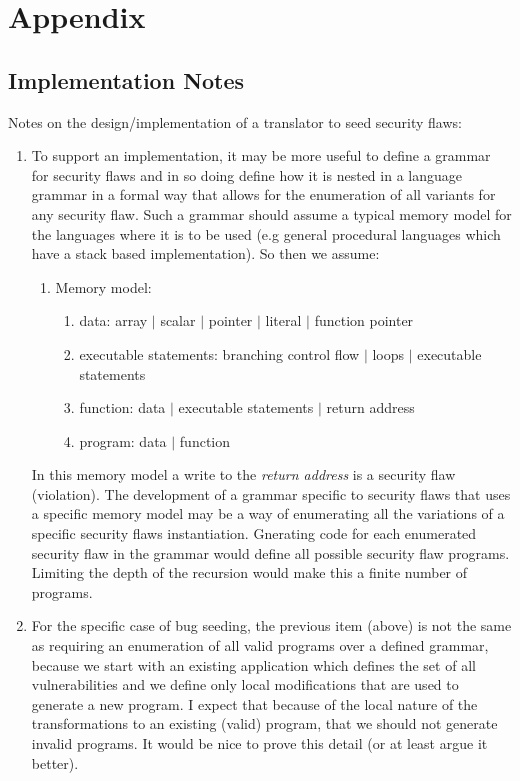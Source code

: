 \section{Appendix}

\subsection{Implementation Notes}
Notes on the design/implementation of a translator to seed security flaws:
\begin{enumerate}

   \item To support an implementation, it may be more useful to define a grammar for
security flaws and in so doing define how it is nested in a language grammar in a formal
way that allows for the enumeration of all variants for any security flaw.
Such a grammar should assume a typical memory model for the languages
where it is to be used (e.g general procedural languages which have a
stack based implementation).  So then we assume:
      \begin{enumerate}
         \item Memory model:
            \begin{enumerate}
               \item data: array $|$ scalar $|$ pointer $|$ literal $|$ function pointer
               \item executable statements: branching control flow $|$ loops $|$ executable statements
               \item function: data $|$ executable statements $|$ return address 
               \item program: data $|$ function 
            \end{enumerate}
      \end{enumerate}
In this memory model a write to the {\em return address} is a security flaw (violation).
The development of a grammar specific to security flaws that uses a specific memory model
may be a way of enumerating all the variations of a specific security flaws instantiation.
Gnerating code for each enumerated security flaw in the grammar would define all possible
security flaw programs.  Limiting the depth of the recursion would make this a finite
number of programs.

   \item For the specific case of bug seeding, the previous item (above) is not the same
         as requiring an enumeration of all valid  programs over
         a defined grammar, because we start with an existing application which defines
         the set of all vulnerabilities and we define only local modifications that
         are used to generate a new program.  I expect that because of the local nature
         of the transformations to an existing (valid) program, that we should not
         generate invalid programs.  It would be nice to prove this detail (or 
         at least argue it better).


\end{enumerate}
